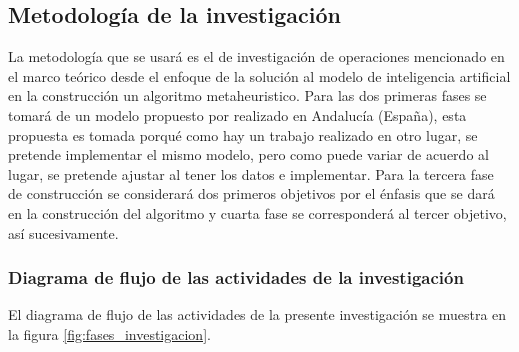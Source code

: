 \subsection{Metodología de la investigación}
La metodología que se usará es el de investigación de operaciones mencionado en el marco teórico desde el enfoque de la solución al modelo de inteligencia artificial en la construcción un algoritmo metaheuristico. Para las dos primeras fases se tomará de un modelo propuesto por  realizado en Andalucía (España), esta propuesta es tomada porqué como hay un trabajo realizado en otro lugar, se pretende implementar el mismo modelo, pero como puede variar de acuerdo al lugar, se pretende ajustar al tener los datos e implementar. Para la tercera fase de construcción se considerará dos primeros objetivos por el énfasis que se dará en la construcción del algoritmo y cuarta fase se corresponderá al tercer objetivo, así sucesivamente.
\subsubsection{Diagrama de flujo de las actividades de la investigación}
El diagrama de flujo de las actividades de la presente investigación se muestra en la figura \ref{fig:fases_investigacion}.

